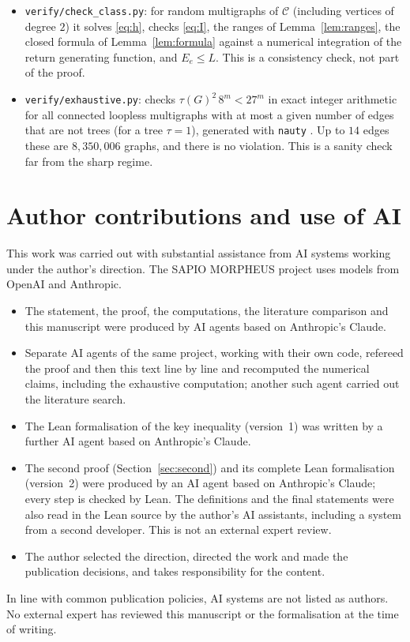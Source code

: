 \documentclass[11pt]{amsart}
\theoremstyle{plain}
\theoremstyle{remark}
\newcommand{\cC}{\mathcal{C}}
\newcommand{\code}[1]{\texttt{#1}}
\begin{document}
\begin{itemize}
\begin{sloppypar}
  replays the $29$ modules in the kernel checker; a recorded clean-room run with three negative controls is
  included (\code{VERIFICATION\_CLEANROOM.txt}, with the raw outputs in \code{logs/}). The file
  \code{PROOF\_ROUTE.md} lists the steps with the names of the Lean theorems.\end{sloppypar}
\item \code{verify/check\_class.py}: for random multigraphs of $\cC$ (including vertices of degree $2$) it solves
  \eqref{eq:h}, checks \eqref{eq:I}, the ranges of Lemma~\ref{lem:ranges}, the closed formula of
  Lemma~\ref{lem:formula} against a numerical integration of the return generating function, and
  $E_e\le L$. This is a consistency check, not part of the proof.
\item \code{verify/exhaustive.py}: checks $\tau(G)^2\,8^m<27^m$ in exact integer arithmetic for all connected
  loopless multigraphs with at most a given number of edges that are not trees (for a tree $\tau=1$), generated
  with \code{nauty} \cite{nauty}. Up to $14$ edges these are $8{,}350{,}006$ graphs, and there is no violation. This
  is a sanity check far from the sharp regime.
\end{itemize}

\section*{Author contributions and use of AI}
This work was carried out with substantial assistance from AI systems working under the author's direction. The
SAPIO MORPHEUS project uses models from OpenAI and Anthropic.
\begin{itemize}
\item The statement, the proof, the computations, the literature comparison and this manuscript were produced by AI
  agents based on Anthropic's Claude.
\item Separate AI agents of the same project, working with their own code, refereed the proof and then this text
  line by line and recomputed the numerical claims, including the exhaustive computation; another such agent
  carried out the literature search.
  
\item The Lean formalisation of the key inequality (version~1) was written by a further AI agent based on
  Anthropic's Claude.
\item The second proof (Section~\ref{sec:second}) and its complete Lean formalisation (version~2) were produced
  by an AI agent based on Anthropic's Claude; every step is checked by Lean. The definitions and the final
  statements were also read in the Lean source by the author's AI assistants, including a system from a second
  developer. This is not an external expert review.
\item The author selected the direction, directed the work and made the publication decisions, and takes
  responsibility for the content.
\end{itemize}
In line with common publication policies, AI systems are not listed as authors. No external expert has reviewed
this manuscript or the formalisation at the time of writing.
\end{document}
